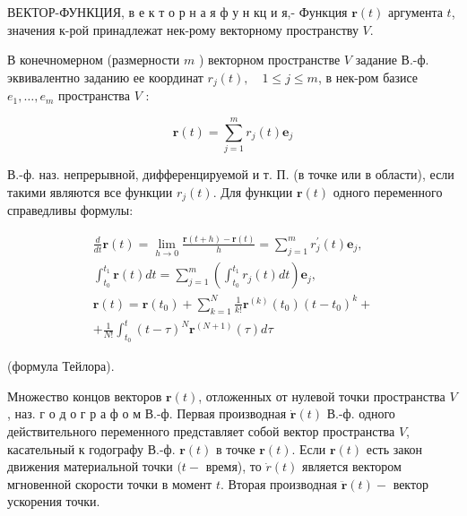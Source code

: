 \documentclass[10pt]{article}
\begin{document}
ВЕКТОР-ФУНКЦИЯ, в е к т о р н а я ф у н кц и я,- Функция $\boldsymbol{r}(t)$ аргумента $t$, значения к-рой принадлежат нек-рому векторному пространству $V$.



В конечномерном (размерности $m$ ) векторном пространстве $V$ задание В.-ф. эквивалентно заданию ее координат $r_{j}(t), \quad 1 \leqslant j \leqslant m$, в нек-ром базисе $e_{1}, \ldots, e_{m}$ пространства $V$ :



\[

\boldsymbol{r}(t)=\sum_{j=1}^{m} r_{j}(t) \boldsymbol{e}_{j}

\]



В.-ф. наз. непрерывной, дифференцируемой и т. П. (в точке или в области), если такими являются все функции $r_{j}(t)$. Для функции $\boldsymbol{r}(t)$ одного переменного справедливы формулы:



\[

\begin{gathered}

\frac{d}{d t} \boldsymbol{r}(t)=\lim _{h \rightarrow 0} \frac{\boldsymbol{r}(t+h)-\boldsymbol{r}(t)}{h}=\sum_{j=1}^{m} r_{j}^{\prime}(t) \boldsymbol{e}_{j}, \\

\int_{t_{0}}^{t_{1}} \boldsymbol{r}(t) d t=\sum_{j=1}^{m}\left(\int_{t_{0}}^{t_{1}} r_{j}(t) d t\right) \boldsymbol{e}_{j}, \\

\boldsymbol{r}(t)=\boldsymbol{r}\left(t_{0}\right)+\sum_{k=1}^{N} \frac{1}{k !} \boldsymbol{r}^{(k)}\left(t_{0}\right)\left(t-t_{0}\right)^{k}+ \\

+\frac{1}{N !} \int_{t_{0}}^{t}(t-\tau)^{N} \boldsymbol{r}^{(N+1)}(\tau) d \tau

\end{gathered}

\]



(формула Тейлора).



Множество концов векторов $\boldsymbol{r}(t)$, отложенных от нулевой точки пространства $V$, наз. г о д о г р а ф о м В.-ф. Первая производная $\dot{\boldsymbol{r}}(t)$ В.-ф. одного действительного переменного представляет собой вектор пространства $V$, касательный к годографу В.-ф. $\boldsymbol{r}(t)$ в точке $\boldsymbol{r}(t)$. Если $\boldsymbol{r}(t)$ есть закон движения материальной точки $(t-$ время), то $\dot{r}(t)$ является вектором мгновенной скорости точки в момент $t$. Вторая производная $\ddot{\boldsymbol{r}}(t)-$ вектор ускорения точки.
\end{document}
